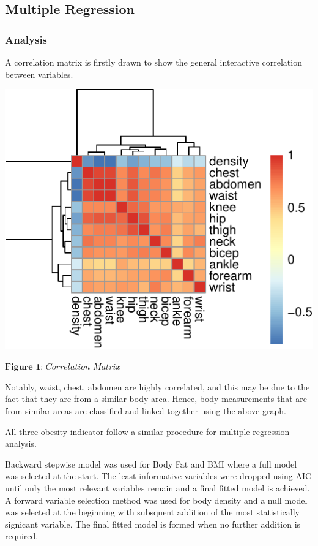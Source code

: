 \documentclass[a4paper,9pt,twocolumn,twoside,]{pinp}
\begin{document}
\hypertarget{multiple-regression}{%
\subsection{Multiple Regression}\label{multiple-regression}}

\hypertarget{analysis-1}{%
\subsubsection{Analysis}\label{analysis-1}}

A correlation matrix is firstly drawn to show the general interactive
correlation between variables.

\begin{center}\includegraphics{Executive_Report_files/figure-latex/unnamed-chunk-1-1} \end{center}

\(\textbf{Figure 1:}\textit{ Correlation Matrix}\)

Notably, waist, chest, abdomen are highly correlated, and this may be
due to the fact that they are from a similar body area. Hence, body
measurements that are from similar areas are classified and linked
together using the above graph.

All three obesity indicator follow a similar procedure for multiple
regression analysis.

Backward stepwise model was used for Body Fat and BMI where a full model
was selected at the start. The least informative variables were dropped
using AIC until only the most relevant variables remain and a final
fitted model is achieved. A forward variable selection method was used
for body density and a null model was selected at the beginning with
subsquent addition of the most statistically signicant variable. The
final fitted model is formed when no further addition is required.
\end{document}
